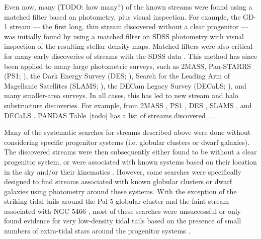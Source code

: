 \documentclass[final,5p,times,twocolumn,authoryear]{elsarticle}
\begin{document}
Even now, many (TODO: how many?) of the known streams were found using a matched filter
based on photometry, plus visual inspection.
For example, the GD-1 stream --- the first long, thin stream discovered without a clear
progenitor --- was initially found by \citet{Grillmair:2006-gd1} using a matched filter
on SDSS photometry with visual inspection of the resulting stellar density maps.
Matched filters were also critical for many early discoveries of streams with the SDSS
data \citep[e.g.,][]{Newberg:2002,Yanny:2003, Belokurov:2006, Grillmair:2006-orphan}.
This method has since been applied to many large photometric surveys, such as 2MASS,
Pan-STARRS (PS1; \citealt{todo}), the Dark Energy Survey (DES; \citealt{todo}), Search
for the Leading Arm of Magellanic Satellites (SLAMS; \citealt{todo}), the DECam Legacy
Survey  (DECaLS; \citealt{todo}), and many smaller-area surveys.
In all cases, this has led to new stream and halo substructure discoveries.
For example, from 2MASS \citep{Rocha-Pinto, GASS, Anticenterstream}, PS1
\citep{Bernard, Ophiuchus, others?}, DES \citep{Shipp:2018}, SLAMS \citep{Jethwa:2018},
and DECaLS \citep{Shipp:2021}. PANDAS
Table~\ref{todo} has a list of streams discovered ...

Many of the systematic searches for streams described above were done without
considering specific progenitor systems (i.e. globular clusters or dwarf galaxies).
The discovered streams were then subsequently either found to be without a clear
progenitor system, or were associated with known systems based on their location in the
sky and/or their kinematics \citep{todo}.
However, some searches were specifically designed to find streams associated with known
globular clusters or dwarf galaxies \citep{Grillmair:1990, todo} using photometry around
these systems.
With the exception of the striking tidal tails around the Pal 5 globular cluster
\citep{Odenkirchen:2002} and the faint stream associated with NGC 5466
\citep{Grillmair:2006-ngc5466}, most of these searches were unsuccessful or only found
evidence for very low-density tidal tails based on the presence of small numbers of
extra-tidal stars around the progenitor systems \citep{Grillmair:TODO}.
\end{document}
